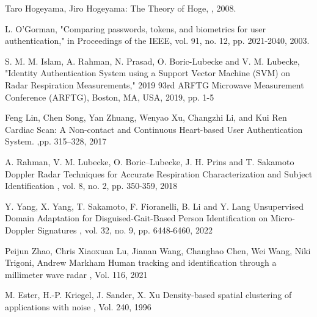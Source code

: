 \begin{bib}[100]


  Taro Hogeyama, Jiro Hogeyama:
  \newblock The Theory of Hoge,
  , 2008.

  L. O'Gorman, "Comparing passwords, tokens, and biometrics for user authentication," in Proceedings of the IEEE, vol. 91, no. 12, pp. 2021-2040, 2003.
  
  S. M. M. Islam, A. Rahman, N. Prasad, O. Boric-Lubecke and V. M. Lubecke, "Identity Authentication System using a Support Vector Machine (SVM) on Radar Respiration Measurements," 2019 93rd ARFTG Microwave Measurement Conference (ARFTG), Boston, MA, USA, 2019, pp. 1-5

  Feng Lin, Chen Song, Yan Zhuang, Wenyao Xu, Changzhi Li, and Kui Ren
  \newblock Cardiac Scan: A Non-contact and Continuous Heart-based User Authentication System. 
   ,pp. 315–328, 2017

  A. Rahman, V. M. Lubecke, O. Boric–Lubecke, J. H. Prins and T. Sakamoto
  \newblock Doppler Radar Techniques for Accurate Respiration Characterization and Subject Identification
  , vol. 8, no. 2, pp. 350-359, 2018


  Y. Yang, X. Yang, T. Sakamoto, F. Fioranelli, B. Li and Y. Lang
  \newblock Unsupervised Domain Adaptation for Disguised-Gait-Based Person Identification on Micro-Doppler Signatures
  , vol. 32, no. 9, pp. 6448-6460, 2022

  Peijun Zhao, Chris Xiaoxuan Lu, Jianan Wang, Changhao Chen, Wei Wang, Niki Trigoni, Andrew Markham
  \newblock Human tracking and identification through a millimeter wave radar
  , Vol. 116, 2021

  M. Ester, H.-P. Kriegel, J. Sander, X. Xu
  \newblock Density-based spatial clustering of applications with noise
  , Vol. 240, 1996


\end{bib}
